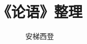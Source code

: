 \documentclass[a5paper]{ctexbook}
\title{《论语》整理}
\author{安梯西登}
\date{}
\begin{document}
    \maketitle

    \tableofcontents

    \chapter{}
\end{document}
